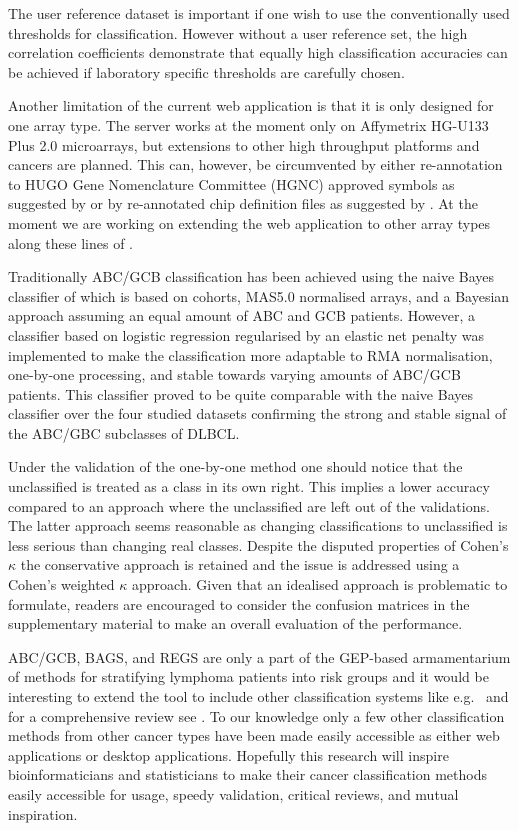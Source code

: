 \documentclass{article}
\begin{document}
The user reference dataset is important if one wish to use the conventionally used thresholds for classification.
However without a user reference set, the high correlation coefficients demonstrate that equally high classification accuracies can be achieved if laboratory specific thresholds are carefully chosen.

Another limitation of the current web application is that it is only designed for one array type.
The server works at the moment only on Affymetrix HG-U133 Plus 2.0 microarrays, but extensions to other high throughput platforms and cancers are planned.
This can, however, be circumvented by either re-annotation to HUGO Gene Nomenclature Committee (HGNC) approved symbols as suggested by \citet{Care2013} or by re-annotated chip definition files as suggested by \citep{Dai2005}.
At the moment we are working on extending the web application to other array types along these lines of \citep{Dai2005}.

Traditionally ABC/GCB classification has been achieved using the naive Bayes classifier of \citet{Wright2003} which is based on cohorts, MAS5.0 normalised arrays, and a Bayesian approach assuming an equal amount of ABC and GCB patients.
However, a classifier based on logistic regression regularised by an elastic net penalty was implemented to make the classification more adaptable to RMA normalisation, one-by-one processing, and stable towards varying amounts of ABC/GCB patients.
This classifier proved to be quite comparable with the naive Bayes classifier over the four studied datasets confirming the strong and stable signal of the ABC/GBC subclasses of DLBCL.

Under the validation of the one-by-one method one should notice that the unclassified is treated as a class in its own right.
This implies a lower accuracy compared to an approach where the unclassified are left out of the validations.
The latter approach seems reasonable as changing classifications to unclassified is less serious than changing real classes.
Despite the disputed properties of Cohen's $\kappa$ the conservative approach is retained and the issue is addressed using a Cohen's weighted $\kappa$ approach.
Given that an idealised approach is problematic to formulate, readers are encouraged to consider the confusion matrices in the supplementary material to make an overall evaluation of the performance.

ABC/GCB, BAGS, and REGS are only a part of the GEP-based armamentarium of methods for stratifying lymphoma patients into risk groups and it would be interesting to extend the tool to include other classification systems like e.g.\ \citep{Shipp2002, Lossos2004a, Malumbres2008} and for a comprehensive review see \citep{Coutinho2013}.
To our knowledge only a few other classification methods from other cancer types have been made easily accessible as either web applications or desktop applications.
Hopefully this research will inspire bioinformaticians and statisticians to make their cancer classification methods easily accessible for usage, speedy validation, critical reviews, and mutual inspiration.
\end{document}
